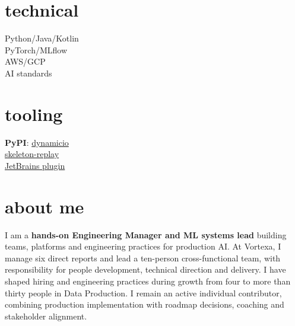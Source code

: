 \documentclass[]{../../../../friggeri-cv}
\begin{document}
\begin{aside}
    \section{technical}
        {\footnotesize Python/Java/Kotlin\\PyTorch/MLflow\\AWS/GCP\\AI standards}
    \section{tooling}
        {\footnotesize \textbf{PyPI}: \href{https://pypi.org/project/dynamicio/}{dynamicio}\\\href{https://pypi.org/project/skeleton-replay/}{skeleton-replay}\\\href{https://plugins.jetbrains.com/plugin/32807-skeleton-replay}{JetBrains plugin}}
\end{aside}

\section{about me}
{\normalsize I am a \textbf{hands-on Engineering Manager and ML systems lead} building teams, platforms and engineering practices for production AI. At Vortexa, I manage six direct reports and lead a ten-person cross-functional team, with responsibility for people development, technical direction and delivery. I have shaped hiring and engineering practices during growth from four to more than thirty people in Data Production. I remain an active individual contributor, combining production implementation with roadmap decisions, coaching and stakeholder alignment.}
\end{document}
